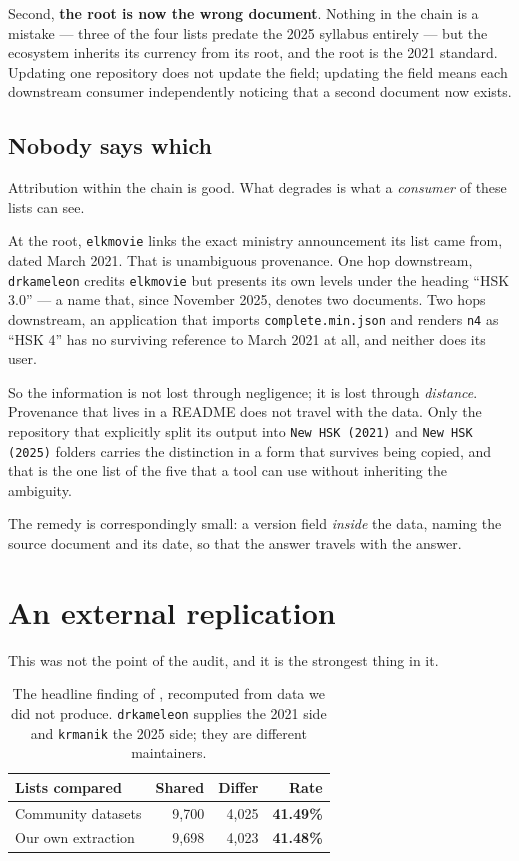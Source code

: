 \documentclass[11pt]{article}
\begin{document}
Second, \textbf{the root is now the wrong document}. Nothing in the chain is a
mistake --- three of the four lists predate the 2025 syllabus entirely --- but
the ecosystem inherits its currency from its root, and the root is the 2021
standard. Updating one repository does not update the field; updating the field
means each downstream consumer independently noticing that a second document now
exists.

\subsection{Nobody says which}

Attribution within the chain is good. What degrades is what a \emph{consumer}
of these lists can see.

At the root, \texttt{elkmovie} links the exact ministry announcement its list
came from, dated March 2021. That is unambiguous provenance. One hop downstream,
\texttt{drkameleon} credits \texttt{elkmovie} but presents its own levels under
the heading ``HSK 3.0'' --- a name that, since November 2025, denotes two
documents. Two hops downstream, an application that imports
\texttt{complete.min.json} and renders \texttt{n4} as ``HSK 4'' has no surviving
reference to March 2021 at all, and neither does its user.

So the information is not lost through negligence; it is lost through
\emph{distance}. Provenance that lives in a README does not travel with the
data. Only the repository that explicitly split its output into \texttt{New HSK
(2021)} and \texttt{New HSK (2025)} folders carries the distinction in a form
that survives being copied, and that is the one list of the five that a tool can
use without inheriting the ambiguity.

The remedy is correspondingly small: a version field \emph{inside} the data,
naming the source document and its date, so that the answer travels with the
answer.

\section{An external replication}
\label{sec:replication}

This was not the point of the audit, and it is the strongest thing in it.

\begin{table}[t]
\centering\small
\begin{tabular}{@{}lrrr@{}}
\toprule
\textbf{Lists compared} & \textbf{Shared} & \textbf{Differ} & \textbf{Rate} \\
\midrule
Community datasets & 9{,}700 & 4{,}025 & \textbf{41.49\%} \\
Our own extraction & 9{,}698 & 4{,}023 & \textbf{41.48\%} \\
\bottomrule
\end{tabular}
\caption{The headline finding of \citet{serrano2026whichhsk}, recomputed from
data we did not produce. \texttt{drkameleon} supplies the 2021 side and
\texttt{krmanik} the 2025 side; they are different maintainers.}
\label{tab:replication}
\end{table}
\end{document}
